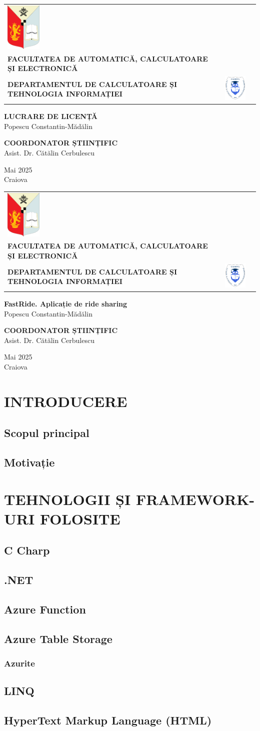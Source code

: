 \documentclass[a4paper,12pt]{report}
\newcommand{\headerpage}[1]
{
\begin{center}
  \begin{tabular}{m{2cm} m{10cm} m{2cm}}
    \includegraphics[width=1.7cm]{left-logo.png} &
    \centering
    {\fontsize{10pt}{10pt}\selectfont
      \textbf{UNIVERSITATEA DIN CRAIOVA} \\[0.3em]
      \textbf{FACULTATEA DE AUTOMATICĂ, CALCULATOARE ȘI ELECTRONICĂ} \\[0.7em]
      \textbf{DEPARTAMENTUL DE CALCULATOARE ȘI TEHNOLOGIA INFORMAȚIEI}
    } &
    \includegraphics[width=1.7cm]{right-logo.png}
  \end{tabular}
\end{center}

\vspace{4cm} %

\begin{center}
  {\fontsize{14pt}{14pt}\selectfont
   \textbf{#1} \\[1em]
  {Popescu Constantin-Mădălin}
  }
\end{center}

\vspace{3cm}

\begin{center}
   {\fontsize{12pt}{12pt}\selectfont
   \textbf{COORDONATOR ȘTIINȚIFIC} \\[1em]
   {Asist. Dr. Cătălin Cerbulescu}
   }
\end{center}

\vfill

\begin{center}
  {\fontsize{12pt}{12pt}\selectfont Mai 2025 \\
  Craiova}
\end{center}
}
\begin{document}
\thispagestyle{empty}
\headerpage{LUCRARE DE LICENȚĂ}

\newpage
\thispagestyle{empty}
\headerpage{FastRide. Aplicație de ride sharing}

\newpage
\thispagestyle{empty}
\null
\newpage

\setcounter{page}{4}
\pagestyle{fancy}

\fancyhf{}
\fancyhead[R]{\nouppercase{\rightmark}}
\renewcommand{\headrulewidth}{0pt}
\fancyfoot[C]{\thepage}

\tableofcontents
\clearpage

\chapter{INTRODUCERE}
\section{Scopul principal}
\section{Motivație}

\newpage
\chapter{TEHNOLOGII ȘI FRAMEWORK-URI FOLOSITE}
\section{C Charp}
\section{.NET}
\section{Azure Function}
\section{Azure Table Storage}
\subsection{Azurite}
\section{LINQ}
\section{HyperText Markup Language (HTML)}
\end{document}
